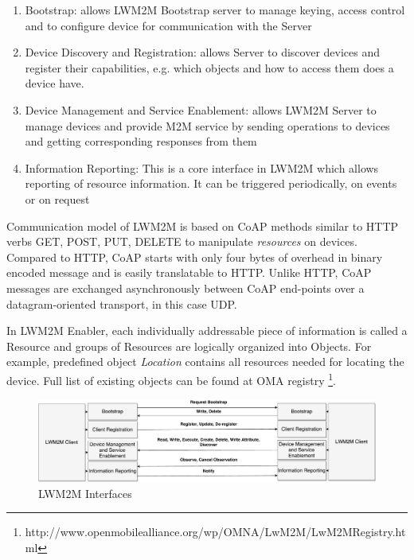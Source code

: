 \begin{enumerate}
	\setlength{\itemsep}{1pt}
	\item Bootstrap: allows LWM2M Bootstrap server to manage keying, access control and to configure device for communication with the Server
	\item Device Discovery and Registration: allows Server to discover devices and register their capabilities, e.g. which objects and how to access them does a device have.
	\item Device Management and Service Enablement: allows LWM2M Server to manage devices and provide M2M service by sending operations to devices and getting corresponding responses from them
	\item Information Reporting: This is a core interface in LWM2M which allows reporting of resource information. It can be triggered periodically, on events or on request
\end{enumerate}

Communication model of LWM2M is based on CoAP methods similar to HTTP verbs GET, POST, PUT, DELETE to manipulate \emph{resources} on devices. Compared to HTTP, CoAP starts with only four bytes of overhead in binary encoded message and is easily translatable to HTTP. Unlike HTTP, CoAP messages are exchanged asynchronously between CoAP end-points over a datagram-oriented transport, in this case UDP.

In LWM2M Enabler, each individually addressable piece of information is called a Resource and groups of Resources are logically organized into Objects. For example, predefined object \emph{Location} contains all resources needed for locating the device. Full list of existing objects can be found at OMA registry \footnote{http://www.openmobilealliance.org/wp/OMNA/LwM2M/LwM2MRegistry.html}.

\begin{figure}[ht]
	\begin{center}
		\includegraphics[width=\textwidth]{images/InterfacesLWM2M}
		\caption{LWM2M Interfaces}
		\label{fig:LWM2MInterfaces}
	\end{center}
\end{figure}

